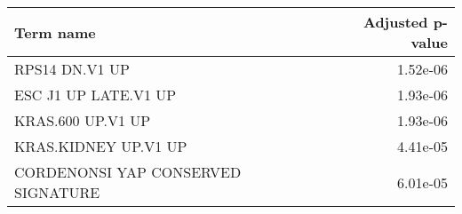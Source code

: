 \begin{tabular}{lr}
\toprule
                          Term name &  Adjusted p-value \\
\midrule
                     RPS14 DN.V1 UP &          1.52e-06 \\
               ESC J1 UP LATE.V1 UP &          1.93e-06 \\
                  KRAS.600 UP.V1 UP &          1.93e-06 \\
               KRAS.KIDNEY UP.V1 UP &          4.41e-05 \\
 CORDENONSI YAP CONSERVED SIGNATURE &          6.01e-05 \\
\bottomrule
\end{tabular}
